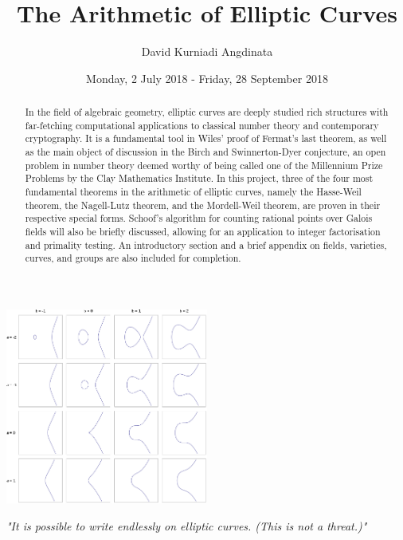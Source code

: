 \documentclass{article}
\title{The Arithmetic of Elliptic Curves}
\author{David Kurniadi Angdinata}
\date{Monday, 2 July 2018 - Friday, 28 September 2018}
\theoremstyle{definition}\newtheorem*{definition}{Definition}
\theoremstyle{definition}\newtheorem*{example}{Example}
\theoremstyle{definition}\newtheorem*{remark}{Remark}
\begin{document}
\maketitle

\vspace{1cm}

\begin{center}
\includegraphics*[width=0.5\textwidth]{img/EllipticCurveCatalog.png}
\end{center}

\vfill

\begin{center}
\emph{"It is possible to write endlessly on elliptic curves. (This is not a threat.)"\cite{lang}} \\
\end{center}

\vspace{1cm}

\begin{abstract}
In the field of algebraic geometry, elliptic curves are deeply studied rich structures with far-fetching computational applications to classical number theory and contemporary cryptography. It is a fundamental tool in Wiles' proof of Fermat's last theorem, as well as the main object of discussion in the Birch and Swinnerton-Dyer conjecture, an open problem in number theory deemed worthy of being called one of the Millennium Prize Problems by the Clay Mathematics Institute. In this project, three of the four most fundamental theorems in the arithmetic of elliptic curves, namely the Hasse-Weil theorem, the Nagell-Lutz theorem, and the Mordell-Weil theorem, are proven in their respective special forms. Schoof's algorithm for counting rational points over Galois fields will also be briefly discussed, allowing for an application to integer factorisation and primality testing. An introductory section and a brief appendix on fields, varieties, curves, and groups are also included for completion.
\end{abstract}
\end{document}
